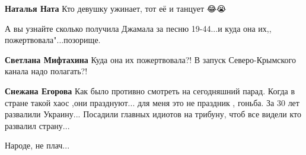 \begin{itemize}
\begin{itemize}
 
\textbf{Наталья Ната} Кто девушку ужинает, тот её и танцует
😂😭

\end{itemize}

 

А вы узнайте сколько получила Джамала за песню 19-44...и куда она их,,
пожертвовала"...позорище.

\begin{itemize}

 
\textbf{Светлана Мифтахина} Куда она их пожертвовала?!
В запуск Северо-Крымского канала надо полагать?!

 
\textbf{Снежана Егорова} Как было противно смотреть на сегодняшний парад. Когда в стране такой хаос ,они празднуют... для меня это не праздник , гоньба. За 30 лет развалили Украину... Посадили главных идиотов на трибуну, чтоб все видели кто развалил страну...
\end{itemize}

 
Народе, не плач...

 

\end{itemize}

